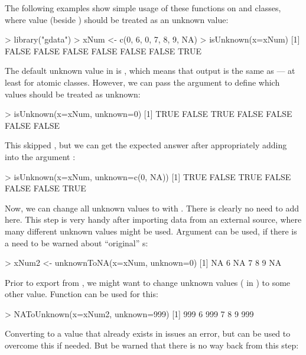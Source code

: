 \documentclass[a4paper]{report}
\begin{document}
\begin{article}
The following examples show simple usage of these functions on
 and  classes, where value  (beside
) should be treated as an unknown value:

\begin{smallverbatim}
> library("gdata")
> xNum <- c(0, 6, 0, 7, 8, 9, NA)
> isUnknown(x=xNum)
[1] FALSE FALSE FALSE FALSE FALSE FALSE TRUE
\end{smallverbatim}

The default unknown value in  is , which means
that output is the same as  --- at least for atomic
classes. However, we can pass the argument  to define which
values should be treated as unknown:

\begin{smallverbatim}
> isUnknown(x=xNum, unknown=0)
[1] TRUE FALSE  TRUE FALSE FALSE FALSE FALSE
\end{smallverbatim}

This skipped , but we can get the expected answer after appropriately
adding  into the argument :

\begin{smallverbatim}
> isUnknown(x=xNum, unknown=c(0, NA))
[1] TRUE FALSE  TRUE FALSE FALSE FALSE TRUE
\end{smallverbatim}

Now, we can change all unknown values to  with .
There is clearly no need to add  here. This step is very handy
after importing data from an external source, where many different unknown
values might be used. Argument  can be used, if there is
a need to be warned about ``original'' s:

\begin{smallverbatim}
> xNum2 <- unknownToNA(x=xNum, unknown=0)
[1] NA  6 NA  7  8  9 NA
\end{smallverbatim}

Prior to export from \R{}, we might want to change unknown values (
in \R{}) to some other value. Function  can be used for
this:

\begin{smallverbatim}
> NAToUnknown(x=xNum2, unknown=999)
[1] 999   6 999   7   8   9 999
\end{smallverbatim}

Converting  to a value that already exists in  issues an
error, but  can be used to overcome this if
needed. But be warned that there is no way back from this step:


\end{article}
\end{document}
